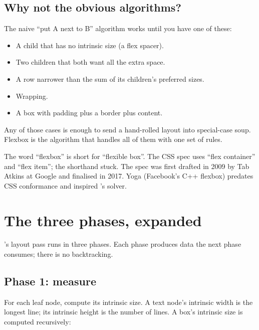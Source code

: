 \subsection*{Why not the obvious algorithms?}

The naive ``put A next to B'' algorithm works until you have one
of these:

\begin{itemize}[leftmargin=*]
  \item A child that has no intrinsic size (a flex spacer).
  \item Two children that both want all the extra space.
  \item A row narrower than the sum of its children's preferred
    sizes.
  \item Wrapping.
  \item A box with padding plus a border plus content.
\end{itemize}

Any of those cases is enough to send a hand-rolled layout into
special-case soup. Flexbox is the algorithm that handles all of
them with one set of rules.

\begin{funfact}
The word ``flexbox'' is short for ``flexible box''. The CSS
spec uses ``flex container'' and ``flex item''; the shorthand
stuck. The spec was first drafted in 2009 by Tab Atkins at
Google and finalised in 2017. Yoga (Facebook's C++ flexbox)
predates CSS conformance and inspired \maya{}'s solver.
\end{funfact}

\section{The three phases, expanded}

\maya{}'s layout pass runs in three phases. Each phase produces
data the next phase consumes; there is no backtracking.

\subsection*{Phase 1: measure}

For each leaf node, compute its intrinsic size. A text node's
intrinsic width is the longest line; its intrinsic height is the
number of lines. A box's intrinsic size is computed recursively:

